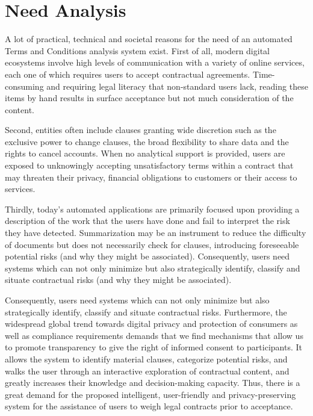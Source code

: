 \section{Need Analysis}
A lot of practical, technical and societal reasons for the need of an
automated Terms and Conditions analysis system exist. First of all, 
modern digital ecosystems involve high levels of communication with a 
variety of online services, each one of which requires users to accept 
contractual agreements.
Time-consuming and requiring legal literacy that non-standard 
users lack, reading these items by hand results in
surface acceptance but not much consideration of the content.

Second, entities often include clauses granting wide discretion such
as the exclusive power to change clauses, the broad flexibility to
share data and the rights to cancel accounts. When no analytical
support is provided, users are exposed to unknowingly accepting
unsatisfactory terms within a contract that may threaten their
privacy, financial obligations to customers or their access to
services.

Thirdly, today’s automated applications are primarily focused upon 
providing a description of the work that the users have done and 
fail to interpret the risk they have detected. 
Summarization may be an instrument to reduce the difficulty of 
documents but does not necessarily check for clauses, introducing 
foreseeable potential risks (and why they might be associated). 
Consequently, users need systems which can not only minimize 
but also strategically identify, classify and
situate contractual risks
(and why they might be associated).

Consequently, users need systems
which can not only minimize but also strategically identify, classify
and situate contractual risks. Furthermore, the widespread global
trend towards digital privacy and protection of consumers as well as
compliance requirements demands that we find mechanisms that allow us
to promote transparency to give the right of informed consent to
participants. It allows the system to identify material clauses,
categorize potential risks, and walks the user through an interactive
exploration of contractual content, and greatly increases their
knowledge and decision-making capacity. Thus, there is a great demand
for the proposed intelligent, user-friendly and privacy-preserving
system for the assistance of users to weigh legal contracts prior to 
acceptance.

